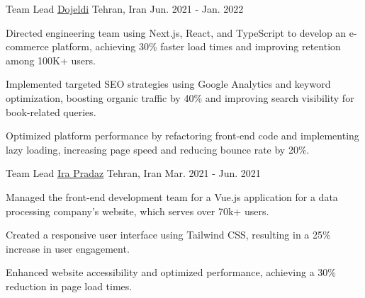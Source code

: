 

\begin{cventries}

    \cventry
    {Team Lead} %
    {\href{https://dojeldi.org/}{Dojeldi}} %
    {Tehran, Iran} %
    {Jun. 2021 - Jan. 2022} %
    {
        \begin{cvitems} %
            \item {Directed engineering team using Next.js, React, and TypeScript to develop an e-commerce platform, achieving 30\% faster load times and improving retention among 100K+ users.}
            \item {Implemented targeted SEO strategies using Google Analytics and keyword optimization, boosting organic traffic by 40\%
                        and improving search visibility for book-related queries.}
            \item {Optimized platform performance by refactoring front-end code and implementing lazy loading, increasing page speed and reducing bounce rate by 20\%.}
        \end{cvitems}
    }

    \cventry
    {Team Lead} %
    {\href{https://irapardaz.ir/}{Ira Pradaz}} %
    {Tehran, Iran} %
    {Mar. 2021 - Jun. 2021} %
    {
        \begin{cvitems} %
            \item {Managed the front-end development team for a Vue.js application for a data processing company's website, which serves over 70k+ users.}
            \item {Created a responsive user interface using Tailwind CSS, resulting in a 25\% increase in user engagement.}
            \item {Enhanced website accessibility and optimized performance, achieving a 30\% reduction in page load times.}
        \end{cvitems}
    }

\end{cventries}
